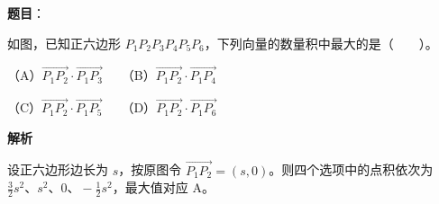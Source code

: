 \begin{answer}

\textbf{题目}：

如图，已知正六边形 $P_1P_2P_3P_4P_5P_6$，下列向量的数量积中最大的是\mbox{（　　）}。
\nopagebreak[4]
\begin{center}\end{center}
\nopagebreak[4]
（A）$\overrightarrow{P_1P_2}\cdot\overrightarrow{P_1P_3}$　　（B）$\overrightarrow{P_1P_2}\cdot\overrightarrow{P_1P_4}$

（C）$\overrightarrow{P_1P_2}\cdot\overrightarrow{P_1P_5}$　　（D）$\overrightarrow{P_1P_2}\cdot\overrightarrow{P_1P_6}$

\textbf{解析}

设正六边形边长为 $s$，按原图令 $\overrightarrow{P_1P_2}=(s,0)$。则四个选项中的点积依次为 $\frac32s^2\text{、}s^2\text{、}0\text{、}-\frac12s^2$，最大值对应 A。


\end{answer}

